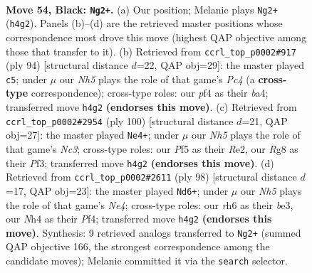 \documentclass[11pt]{article}
\begin{document}
\clearpage

\begin{figure}[p]\centering
\begin{subfigure}{0.46\textwidth}\centering
\resizebox{\linewidth}{!}{%
\newchessgame
\chessboard[
  setfen={1k4r1/p7/Pp5R/1B3p2/5P1n/4K3/8/8 b - - 0 54},
  showmover=false,
  pgfstyle=straightmove, color=movearrow, markmove={h4-g2}
]}
\caption{}
\end{subfigure}\hfill
\begin{subfigure}{0.46\textwidth}\centering
\resizebox{\linewidth}{!}{%
\newchessgame
\chessboard[
  setfen={6k1/8/3N4/6p1/b1Pr3p/8/P5P1/2R3K1 w - - 2 48},
  showmover=false,
  pgfstyle=straightmove, color=movearrow, markmove={c4-c5}
]}
\caption{}
\end{subfigure}
\\[4pt]
\begin{subfigure}{0.46\textwidth}\centering
\resizebox{\linewidth}{!}{%
\newchessgame
\chessboard[
  setfen={8/8/5kp1/4p3/P4bP1/r1N2P2/4RK2/8 w - - 3 51},
  showmover=false,
  pgfstyle=straightmove, color=movearrow, markmove={c3-e4}
]}
\caption{}
\end{subfigure}\hfill
\begin{subfigure}{0.46\textwidth}\centering
\resizebox{\linewidth}{!}{%
\newchessgame
\chessboard[
  setfen={8/5kp1/7p/7P/2r1NP2/4b1PK/8/8 w - - 0 50},
  showmover=false,
  pgfstyle=straightmove, color=movearrow, markmove={e4-d6}
]}
\caption{}
\end{subfigure}
\caption{\textbf{Move 54, Black: \texttt{Ng2+}.} (a) Our position; Melanie plays \texttt{Ng2+} (\texttt{h4g2}). Panels (b)--(d) are the retrieved master positions whose correspondence most drove this move (highest QAP objective among those that transfer to it). (b) Retrieved from \texttt{ccrl\_top\_p0002\#917} (ply 94) [structural distance $d$=22, QAP obj=29]: the master played \texttt{c5}; under $\mu$ our \emph{Nh5} plays the role of that game's \emph{Pc4} (a \textbf{cross-type} correspondence); cross-type roles: our \emph{p}f4 as their \emph{b}a4; transferred move \texttt{h4g2} \textbf{(endorses this move)}. (c) Retrieved from \texttt{ccrl\_top\_p0002\#2954} (ply 100) [structural distance $d$=21, QAP obj=27]: the master played \texttt{Ne4+}; under $\mu$ our \emph{Nh5} plays the role of that game's \emph{Nc3}; cross-type roles: our \emph{P}f5 as their \emph{R}e2, our \emph{R}g8 as their \emph{P}f3; transferred move \texttt{h4g2} \textbf{(endorses this move)}. (d) Retrieved from \texttt{ccrl\_top\_p0002\#2611} (ply 98) [structural distance $d$=17, QAP obj=23]: the master played \texttt{Nd6+}; under $\mu$ our \emph{Nh5} plays the role of that game's \emph{Ne4}; cross-type roles: our \emph{r}h6 as their \emph{b}e3, our \emph{N}h4 as their \emph{P}f4; transferred move \texttt{h4g2} \textbf{(endorses this move)}. Synthesis: 9 retrieved analogs transferred to \texttt{Ng2+} (summed QAP objective 166, the strongest correspondence among the candidate moves); Melanie committed it via the \texttt{search} selector.}
\label{fig:thought-m107}
\end{figure}
\end{document}
